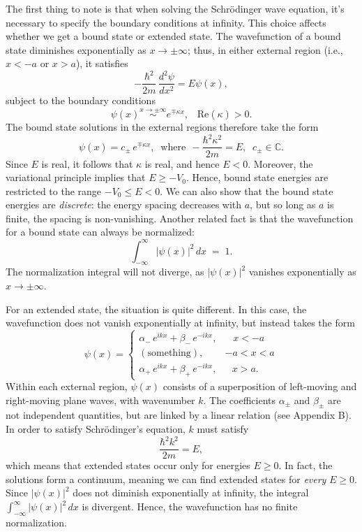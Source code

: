 \documentclass[pra,12pt]{revtex4}
\begin{document}
The first thing to note is that when solving the Schr\"odinger wave
equation, it's necessary to specify the boundary conditions at
infinity.  This choice affects whether we get a bound state or
extended state.  The wavefunction of a bound state diminishes
exponentially as $x \rightarrow \pm\infty$; thus, in either external
region (i.e., $x < -a$ or $x > a$), it satisfies
$$-\frac{\hbar^2}{2m}\,\frac{d^2\psi}{dx^2} = E \psi(x),$$
subject to the boundary conditions
$$\psi(x) \overset{x\rightarrow\pm\infty}{\sim} e^{\mp\kappa x}, \;\;\;\mathrm{Re}(\kappa) > 0.$$
The bound state solutions in the external regions therefore take the
form
$$\psi(x) = c_\pm\, e^{\mp\kappa x}, \;\;\mathrm{where}\;\, -\frac{\hbar^2\kappa^2}{2m} = E, \;\; c_\pm \in \mathbb{C}.$$
Since $E$ is real, it follows that $\kappa$ is real, and hence $E <
0$.  Moreover, the variational principle implies that $E \ge -V_0$.
Hence, bound state energies are restricted to the range $-V_0 \le E <
0$.  We can also show that the bound state energies are
\textit{discrete}: the energy spacing decreases with $a$, but so long
as $a$ is finite, the spacing is non-vanishing.  Another related
fact is that the wavefunction for a bound state can always be
normalized:
$$\int_{-\infty}^\infty |\psi(x)|^2\, dx\; =\; 1.$$
The normalization integral will not diverge, as $|\psi(x)|^2$ vanishes
exponentially as $x \rightarrow \pm \infty$.

For an extended state, the situation is quite different.  In this
case, the wavefunction does not vanish exponentially at infinity, but
instead takes the form
$$\psi(x) = \begin{cases} \alpha_-\, e^{ik x} + \beta_-\, e^{-ik x}, & \;\;\;x < -a\\ (\mathrm{something}) , & -a < x < a\\ \alpha_+\, e^{ik x} + \beta_+\, e^{-ik x} , & \;\;\,x > a.\end{cases}$$
Within each external region, $\psi(x)$ consists of a superposition of
left-moving and right-moving plane waves, with wavenumber $k$.  The
coefficients $\alpha_\pm$ and $\beta_\pm$ are not independent
quantities, but are linked by a linear relation (see Appendix B).  In
order to satisfy Schr\"odinger's equation, $k$ must satisfy
$$\frac{\hbar^2k^2}{2m} = E,$$
which means that extended states occur only for energies $E \ge 0$.
In fact, the solutions form a continuum, meaning we can find extended
states for \textit{every} $E \ge 0$.  Since $|\psi(x)|^2$ does not
diminish exponentially at infinity, the integral $\int_{-\infty}^\infty
|\psi(x)|^2\, dx$ is divergent.  Hence, the wavefunction
has no finite normalization.
\end{document}
